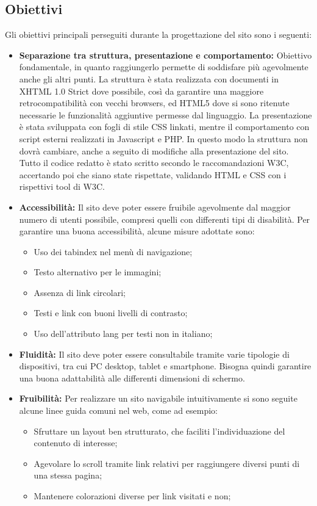 \documentclass{article}
\begin{document}
		\subsection{Obiettivi}
		Gli obiettivi principali perseguiti durante la progettazione del sito sono i seguenti:
		\begin{itemize}
		    \item \textbf{Separazione tra struttura, presentazione e comportamento:}
		    Obiettivo fondamentale, in quanto raggiungerlo permette di soddisfare più agevolmente anche gli altri punti. 
		    La struttura è stata realizzata con documenti in XHTML 1.0 Strict dove possibile, così da garantire una maggiore retrocompatibilità con vecchi browsers, ed HTML5 dove si sono ritenute necessarie le funzionalità aggiuntive permesse dal linguaggio. 
		    La presentazione è stata sviluppata con fogli di stile CSS linkati, mentre il comportamento con script esterni realizzati in Javascript e PHP. In questo modo la struttura non dovrà cambiare, anche a seguito di modifiche alla presentazione del sito.
		    Tutto il codice redatto è stato scritto secondo le raccomandazioni W3C, accertando poi che siano state rispettate, validando HTML e CSS con i rispettivi tool di W3C.
		    \item \textbf{Accessibilità:}
		    Il sito deve poter essere fruibile agevolmente dal maggior numero di utenti possibile, compresi quelli con differenti tipi di disabilità. Per garantire una buona accessibilità, alcune misure adottate sono:
		    \begin{itemize}
		        \item Uso dei tabindex nel menù di navigazione;
		        \item Testo alternativo per le immagini;
		        \item Assenza di link circolari;
		        \item Testi e link con buoni livelli di contrasto;
		        \item Uso dell'attributo lang per testi non in italiano;
		    \end{itemize}
		    \item \textbf{Fluidità:}
		    Il sito deve poter essere consultabile tramite varie tipologie di dispositivi, tra cui PC desktop, tablet e smartphone. Bisogna quindi garantire una buona adattabilità alle differenti dimensioni di schermo.
		    \item \textbf{Fruibilità:}
		    Per realizzare un sito navigabile intuitivamente si sono seguite alcune linee guida comuni nel web, come ad esempio:
		    \begin{itemize}
		        \item Sfruttare un layout ben strutturato, che faciliti l'individuazione del contenuto di interesse;
		        \item Agevolare lo scroll tramite link relativi per raggiungere diversi punti di una stessa pagina;
		        \item Mantenere colorazioni diverse per link visitati e non;
		    \end{itemize}
		\end{itemize}
\end{document}
